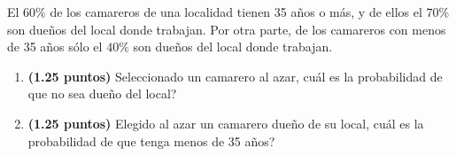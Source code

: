 
El $60\%$ de los camareros de una localidad tienen 35 años o más, y de ellos el $70\%$ son dueños del local donde trabajan. Por otra parte, de los camareros con menos de 35 años sólo el $40\%$ son dueños del local donde trabajan.
\begin{enumerate}[label=\alph*)]
\item \textbf{(1.25 puntos)} Seleccionado un camarero al azar, \textquestiondown{}cuál es la probabilidad de que no sea dueño del local?
\item \textbf{(1.25 puntos)} Elegido al azar un camarero dueño de su local, \textquestiondown{}cuál es la probabilidad de que tenga menos de 35 años?
\end{enumerate}
